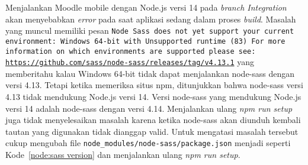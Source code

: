 Menjalankan Moodle mobile dengan Node.js versi 14 pada \textit{branch Integration} akan menyebabkan \textit{error} pada saat aplikasi sedang dalam proses \textit{build}. Masalah yang muncul memiliki pesan \texttt{Node Sass does not yet support your current environment: Windows 64-bit with Unsupported runtime (83)
For more information on which environments are supported please see:
\url{https://github.com/sass/node-sass/releases/tag/v4.13.1}} yang memberitahu kalau Windows 64-bit tidak dapat menjalankan node-sass dengan versi 4.13. Tetapi ketika memeriksa situs npm, ditunjukkan bahwa node-sass versi 4.13 tidak mendukung Node.js versi 14. Versi node-sass yang mendukung Node.js versi 14 adalah node-sass dengan versi 4.14\cite{node:sass}. Menjalankan ulang \textit{npm run setup} juga tidak menyelesaikan masalah karena ketika node-sass akan diunduh kembali tautan yang digunakan tidak dianggap valid. Untuk mengatasi masalah tersebut cukup mengubah file \texttt{node\_modules/node-sass/package.json} menjadi seperti \mbox{Kode \ref{node:sass version}} dan menjalankan ulang  \textit{npm run setup}. \\ \\

